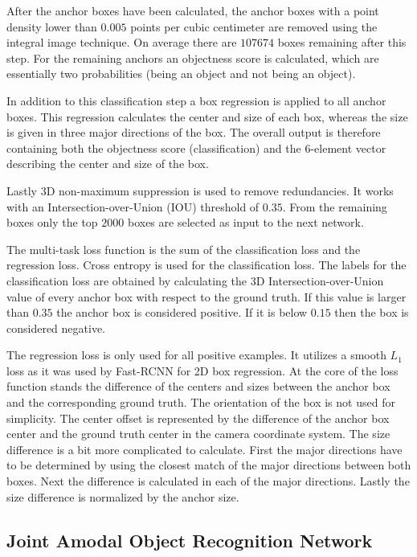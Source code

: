 \documentclass[12pt]{scrartcl}
\begin{document}
After the anchor boxes have been calculated, the anchor boxes with a point density
lower than \(0.005\) points per cubic centimeter are removed using the integral
image technique. On average there are \(107674\) boxes remaining after this step.
For the remaining anchors an objectness score is calculated, which are essentially
two probabilities (being an object and not being an object).

In addition to this classification step a box regression is applied to all
anchor boxes. This regression calculates the center and size of each
box, whereas the size is given in three major directions of the box.
The overall output is therefore containing both the objectness score (classification)
and the 6-element vector describing the center and size of the box.

Lastly 3D non-maximum suppression is used to remove redundancies. It works with
an Intersection-over-Union (IOU) threshold of \(0.35\). From the remaining
boxes only the top \(2000\) boxes are selected as input to the next network.

The multi-task loss function is the sum of the classification loss and the
regression loss. Cross entropy is used for the classification loss.
The labels for the classification loss are obtained by calculating the 3D
Intersection-over-Union value of every anchor box with respect to the ground truth.
If this value is larger than \(0.35\) the anchor box is considered positive. If
it is below \(0.15\) then the box is considered negative.

The regression loss is only used for all positive examples. It utilizes a smooth
\(L_1\) loss as it was used by Fast-RCNN\cite{Girshick2015} for 2D box regression.
At the core of the loss function stands the difference of the centers and sizes
between the anchor box and the corresponding ground truth. The orientation of
the box is not used for simplicity. The center offset is represented
by the difference of the anchor box center and the ground truth center in the
camera coordinate system. The size difference is a bit more complicated to calculate.
First the major directions have to be determined by using the closest match of
the major directions between both boxes. Next the difference is calculated in
each of the major directions. Lastly the size difference is normalized by the
anchor size.

\subsection{Joint Amodal Object Recognition Network}
\end{document}
